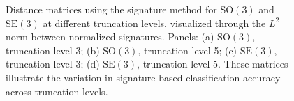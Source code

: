 \begin{figure}
\begin{subfigure}{0.48\textwidth}
        \caption{}
        \label{fig:classification-signature-level5-SE3}
    \end{subfigure}
    \caption[Classification using logarithmic signature on curves in \(\mathrm{SO}(3)\) and \(\mathrm{SE}(3)\)]{Distance matrices using the signature method for \(\mathrm{SO}(3)\) and \(\mathrm{SE}(3)\) at different truncation levels, visualized through the \(L^2\) norm between normalized signatures. Panels: (a) \(\mathrm{SO}(3)\), truncation level 3; (b) \(\mathrm{SO}(3)\), truncation level 5; (c) \(\mathrm{SE}(3)\), truncation level 3; (d) \(\mathrm{SE}(3)\), truncation level 5. These matrices illustrate the variation in signature-based classification accuracy across truncation levels.}
    \label{fig:classification-signature}
\end{figure}

